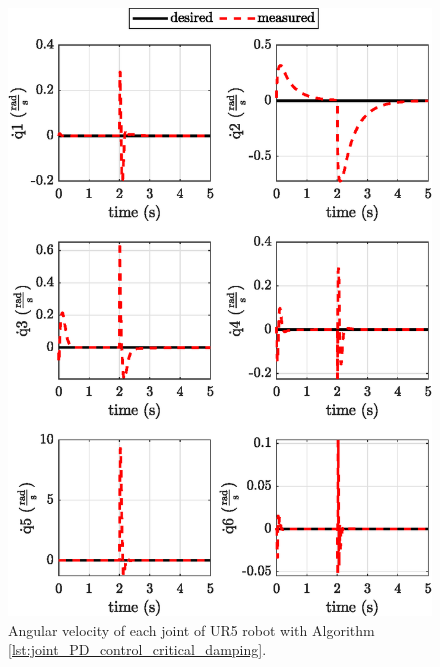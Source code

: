 \begin{figure}
    \centering
    \includegraphics{images/act_1.5/joint_velocity.eps}
    \caption{Angular velocity of each joint of UR5 robot with Algorithm \ref{lst:joint_PD_control_critical_damping}.}
    \label{fig:act_1.5_joint_velocity}
\end{figure}

